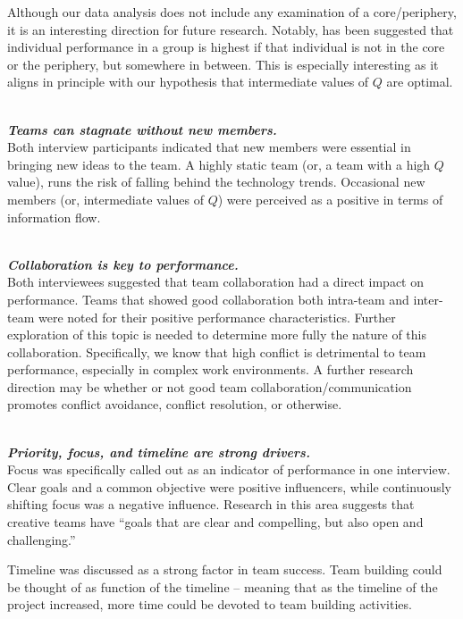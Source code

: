 \documentclass{proc}
\begin{document}
Although our data analysis does not include any examination of a core/periphery, it is an interesting direction for future research. Notably, has been suggested that individual performance in a group is highest if that individual is not in the core or the periphery, but somewhere in between\cite{cattani2008core}. This is especially interesting as it aligns in principle with our hypothesis that intermediate values of $Q$ are optimal.

\noindent\\\textit{\textbf{Teams can stagnate without new members.}}\\
Both interview participants indicated that new members were essential in bringing new ideas to the team. A highly static team (or, a team with a high $Q$ value), runs the risk of falling behind the technology trends. Occasional new members (or, intermediate values of $Q$) were perceived as a positive in terms of information flow.

\noindent\\\textit{\textbf{Collaboration is key to performance.}}\\
Both interviewees suggested that team collaboration had a direct impact on performance. Teams that showed good collaboration both intra-team and inter-team were noted for their positive performance characteristics. Further exploration of this topic is needed to determine more fully the nature of this collaboration. Specifically, we know that high conflict is detrimental to team performance, especially in complex work environments\cite{de2003task}. A further research direction may be whether or not good team collaboration/communication promotes conflict avoidance, conflict resolution, or otherwise.

\noindent\\\textit{\textbf{Priority, focus, and timeline are strong drivers.}}\\
Focus was specifically called out as an indicator of performance in one interview. Clear goals and a common objective were positive influencers, while continuously shifting focus was a negative influence. Research in this area suggests that creative teams have ``goals that are clear and compelling, but also open and challenging.''\cite{isaksen2002climate}

Timeline was discussed as a strong factor in team success. Team building could be thought of as function of the timeline -- meaning that as the timeline of the project increased, more time could be devoted to team building activities.
\end{document}
